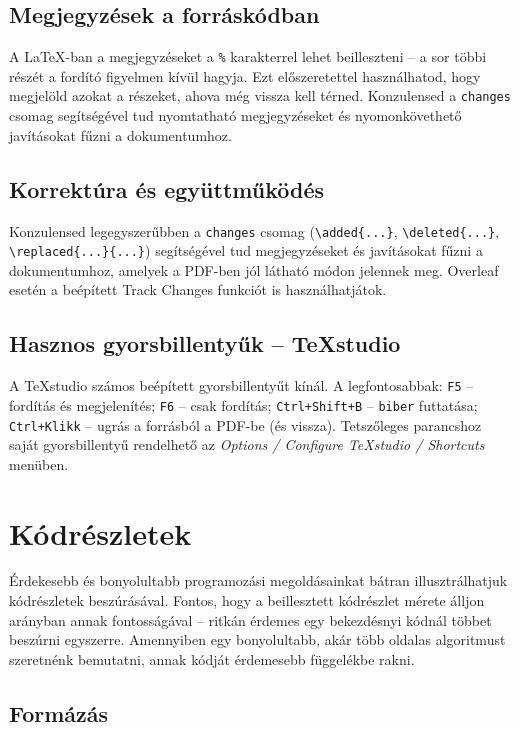 \subsection{Megjegyzések a forráskódban}

A \LaTeX-ban a megjegyzéseket a \verb|%| karakterrel lehet beilleszteni -- a
sor többi részét a fordító figyelmen kívül hagyja. Ezt előszeretettel
használhatod, hogy megjelöld azokat a részeket, ahova még vissza kell térned.
Konzulensed a \texttt{changes} csomag segítségével tud nyomtatható
megjegyzéseket és nyomonkövethető javításokat fűzni a dokumentumhoz.

\subsection{Korrektúra és együttműködés}

Konzulensed legegyszerűbben a \texttt{changes} csomag
(\verb|\added{...}|, \verb|\deleted{...}|, \verb|\replaced{...}{...}|)
segítségével tud megjegyzéseket és javításokat fűzni a dokumentumhoz, amelyek
a PDF-ben jól látható módon jelennek meg. Overleaf esetén a beépített Track
Changes funkciót is használhatjátok.

\subsection{Hasznos gyorsbillentyűk -- TeXstudio}

A TeXstudio számos beépített gyorsbillentyűt kínál. A legfontosabbak:
\texttt{F5} -- fordítás és megjelenítés; \texttt{F6} -- csak fordítás;
\texttt{Ctrl+Shift+B} -- \texttt{biber} futtatása; \texttt{Ctrl+Klikk} -- ugrás
a forrásból a PDF-be (és vissza). Tetszőleges parancshoz saját
gyorsbillentyű rendelhető az \textit{Options / Configure TeXstudio / Shortcuts}
menüben.

\section{Kódrészletek}

Érdekesebb és bonyolultabb programozási megoldásainkat bátran illusztrálhatjuk
kódrészletek beszúrásával. Fontos, hogy a beillesztett kódrészlet mérete álljon
arányban annak fontosságával -- ritkán érdemes egy bekezdésnyi kódnál többet
beszúrni egyszerre. Amennyiben egy bonyolultabb, akár több oldalas algoritmust
szeretnénk bemutatni, annak kódját érdemesebb függelékbe rakni.

\subsection{Formázás}

